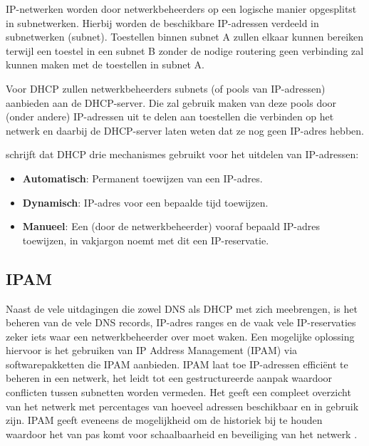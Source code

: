 IP-netwerken worden door netwerkbeheerders op een logische manier opgesplitst in subnetwerken. Hierbij worden de beschikbare IP-adressen verdeeld in subnetwerken (subnet). Toestellen binnen subnet A zullen elkaar kunnen bereiken terwijl een toestel in een subnet B zonder de nodige routering geen verbinding zal kunnen maken met de toestellen in subnet A.

Voor DHCP zullen netwerkbeheerders subnets (of pools van IP-adressen) aanbieden aan de DHCP-server. Die zal gebruik maken van deze pools door (onder andere) IP-adressen uit te delen aan toestellen die verbinden op het netwerk en daarbij de DHCP-server laten weten dat ze nog geen IP-adres hebben.

\textcite{Droms1997} schrijft dat DHCP drie mechanismes gebruikt voor het uitdelen van IP-adressen:
\begin{itemize}
    \item \textbf{Automatisch}: Permanent toewijzen van een IP-adres.
    \item \textbf{Dynamisch}: IP-adres voor een bepaalde tijd toewijzen.
    \item \textbf{Manueel}: Een (door de netwerkbeheerder) vooraf bepaald IP-adres toewijzen, in vakjargon noemt met dit een IP-reservatie.
\end{itemize}

\subsection{IPAM}
Naast de vele uitdagingen die zowel DNS als DHCP met zich meebrengen, is het beheren van de vele DNS records, IP-adres ranges en de vaak vele IP-reservaties zeker iets waar een netwerkbeheerder over moet waken. 
Een mogelijke oplossing hiervoor is het gebruiken van IP Address Management (IPAM) via softwarepakketten die IPAM aanbieden.
IPAM laat toe IP-adressen efficiënt te beheren in een netwerk, het leidt tot een gestructureerde aanpak waardoor conflicten tussen subnetten worden vermeden. Het geeft een compleet overzicht van het netwerk met percentages van hoeveel adressen beschikbaar en in gebruik zijn. IPAM geeft eveneens de mogelijkheid om de historiek bij te houden waardoor het van pas komt voor schaalbaarheid en beveiliging van het netwerk \autocite{Rooney2020}.

